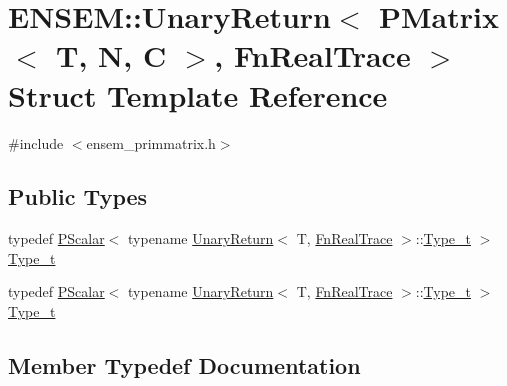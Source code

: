 \hypertarget{structENSEM_1_1UnaryReturn_3_01PMatrix_3_01T_00_01N_00_01C_01_4_00_01FnRealTrace_01_4}{}\section{E\+N\+S\+EM\+:\+:Unary\+Return$<$ P\+Matrix$<$ T, N, C $>$, Fn\+Real\+Trace $>$ Struct Template Reference}
\label{structENSEM_1_1UnaryReturn_3_01PMatrix_3_01T_00_01N_00_01C_01_4_00_01FnRealTrace_01_4}


{\ttfamily \#include $<$ensem\+\_\+primmatrix.\+h$>$}

\subsection*{Public Types}
\begin{DoxyCompactItemize}
\item 
typedef \mbox{\hyperlink{classENSEM_1_1PScalar}{P\+Scalar}}$<$ typename \mbox{\hyperlink{structENSEM_1_1UnaryReturn}{Unary\+Return}}$<$ T, \mbox{\hyperlink{structENSEM_1_1FnRealTrace}{Fn\+Real\+Trace}} $>$\+::\mbox{\hyperlink{structENSEM_1_1UnaryReturn_3_01PMatrix_3_01T_00_01N_00_01C_01_4_00_01FnRealTrace_01_4_a22a5a3f850fb258f3825c3a6f84a3259}{Type\+\_\+t}} $>$ \mbox{\hyperlink{structENSEM_1_1UnaryReturn_3_01PMatrix_3_01T_00_01N_00_01C_01_4_00_01FnRealTrace_01_4_a22a5a3f850fb258f3825c3a6f84a3259}{Type\+\_\+t}}
\item 
typedef \mbox{\hyperlink{classENSEM_1_1PScalar}{P\+Scalar}}$<$ typename \mbox{\hyperlink{structENSEM_1_1UnaryReturn}{Unary\+Return}}$<$ T, \mbox{\hyperlink{structENSEM_1_1FnRealTrace}{Fn\+Real\+Trace}} $>$\+::\mbox{\hyperlink{structENSEM_1_1UnaryReturn_3_01PMatrix_3_01T_00_01N_00_01C_01_4_00_01FnRealTrace_01_4_a22a5a3f850fb258f3825c3a6f84a3259}{Type\+\_\+t}} $>$ \mbox{\hyperlink{structENSEM_1_1UnaryReturn_3_01PMatrix_3_01T_00_01N_00_01C_01_4_00_01FnRealTrace_01_4_a22a5a3f850fb258f3825c3a6f84a3259}{Type\+\_\+t}}
\end{DoxyCompactItemize}


\subsection{Member Typedef Documentation}
\mbox{\label{structENSEM_1_1UnaryReturn_3_01PMatrix_3_01T_00_01N_00_01C_01_4_00_01FnRealTrace_01_4_a22a5a3f850fb258f3825c3a6f84a3259}} 
